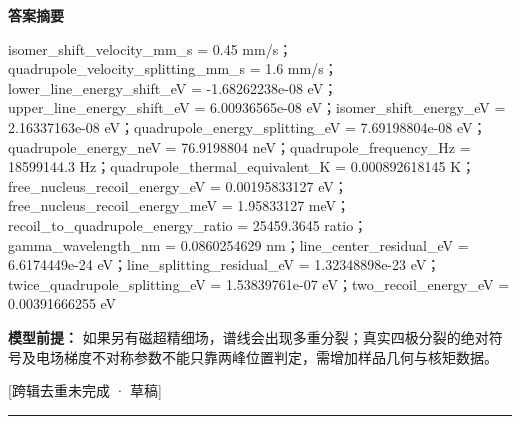 \documentclass[UTF8,11pt,a4paper]{ctexart}
\begin{document}
\noindent\textbf{答案摘要}\par
isomer\_shift\_velocity\_mm\_s = 0.45 mm/s；quadrupole\_velocity\_splitting\_mm\_s = 1.6 mm/s；lower\_line\_energy\_shift\_eV = -1.68262238e-08 eV；upper\_line\_energy\_shift\_eV = 6.00936565e-08 eV；isomer\_shift\_energy\_eV = 2.16337163e-08 eV；quadrupole\_energy\_splitting\_eV = 7.69198804e-08 eV；quadrupole\_energy\_neV = 76.9198804 neV；quadrupole\_frequency\_Hz = 18599144.3 Hz；quadrupole\_thermal\_equivalent\_K = 0.000892618145 K；free\_nucleus\_recoil\_energy\_eV = 0.00195833127 eV；free\_nucleus\_recoil\_energy\_meV = 1.95833127 meV；recoil\_to\_quadrupole\_energy\_ratio = 25459.3645 ratio；gamma\_wavelength\_nm = 0.0860254629 nm；line\_center\_residual\_eV = 6.6174449e-24 eV；line\_splitting\_residual\_eV = 1.32348898e-23 eV；twice\_quadrupole\_splitting\_eV = 1.53839761e-07 eV；two\_recoil\_energy\_eV = 0.00391666255 eV\par
\noindent\textbf{模型前提：}
如果另有磁超精细场，谱线会出现多重分裂；真实四极分裂的绝对符号及电场梯度不对称参数不能只靠两峰位置判定，需增加样品几何与核矩数据。\par
\noindent\textcolor{red!65!black}{[跨辑去重未完成 · 草稿]} \par
\medskip\hrule\medskip
{}
\end{document}
